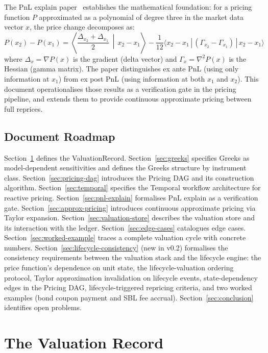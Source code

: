 \documentclass[11pt,a4paper]{article}
\begin{document}
The PnL explain paper~\cite{pnl_explain} establishes the mathematical foundation: for a pricing function $P$ approximated as a polynomial of degree three in the market data vector $x$, the price change decomposes as:
\[
P(x_2) - P(x_1) = \left\langle \frac{\Delta_{x_2} + \Delta_{x_1}}{2} \,\middle|\, x_2 - x_1 \right\rangle - \frac{1}{12}\langle x_2 - x_1 \,|\, (\Gamma_{x_2} - \Gamma_{x_1}) \,|\, x_2 - x_1 \rangle
\]
where $\Delta_x = \nabla P(x)$ is the gradient (delta vector) and $\Gamma_x = \nabla^2 P(x)$ is the Hessian (gamma matrix).  The paper distinguishes ex ante PnL (using only information at $x_1$) from ex post PnL (using information at both $x_1$ and $x_2$).  This document operationalises those results as a verification gate in the pricing pipeline, and extends them to provide continuous approximate pricing between full reprices.

\subsection{Document Roadmap}

Section~\ref{sec:valuation-record} defines the ValuationRecord.  Section~\ref{sec:greeks} specifies Greeks as model-dependent sensitivities and defines the Greeks structure by instrument class.  Section~\ref{sec:pricing-dag} introduces the Pricing DAG and its construction algorithm.  Section~\ref{sec:temporal} specifies the Temporal workflow architecture for reactive pricing.  Section~\ref{sec:pnl-explain} formalises PnL explain as a verification gate.  Section~\ref{sec:approx-pricing} introduces continuous approximate pricing via Taylor expansion.  Section~\ref{sec:valuation-store} describes the valuation store and its interaction with the ledger.  Section~\ref{sec:edge-cases} catalogues edge cases.  Section~\ref{sec:worked-example} traces a complete valuation cycle with concrete numbers.  Section~\ref{sec:lifecycle-consistency} (new in v0.2) formalises the consistency requirements between the valuation stack and the lifecycle engine: the price function's dependence on unit state, the lifecycle-valuation ordering protocol, Taylor approximation invalidation on lifecycle events, state-dependency edges in the Pricing DAG, lifecycle-triggered repricing criteria, and two worked examples (bond coupon payment and SBL fee accrual).  Section~\ref{sec:conclusion} identifies open problems.

\clearpage
\section{The Valuation Record}
\label{sec:valuation-record}
\end{document}
